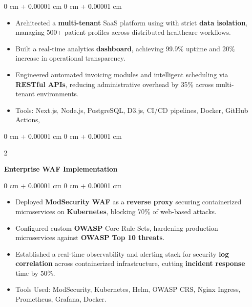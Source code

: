 \documentclass[10pt, letterpaper]{article}
\newenvironment{highlights}{
    \begin{itemize}[
        topsep=0.10 cm,
        parsep=0.10 cm,
        partopsep=0pt,
        itemsep=0pt,
        leftmargin=0 cm + 10pt
    ]
}{
    \end{itemize}
} %
\newenvironment{onecolentry}{
    \begin{adjustwidth}{
        0 cm + 0.00001 cm
    }{
        0 cm + 0.00001 cm
    }
}{
    \end{adjustwidth}
} %
\newenvironment{twocolentry}[2][]{
    \onecolentry
    \def\secondColumn{#2}
    \setcolumnwidth{\fill, 4.5 cm}
    \begin{paracol}{2}
}{
    \switchcolumn \raggedleft \secondColumn
    \end{paracol}
    \endonecolentry
} %
\begin{document}
        \vspace{0.10 cm}
        \begin{onecolentry}
            \begin{highlights}
                \item Architected a \textbf{multi-tenant} SaaS platform using  with strict \textbf{data isolation}, managing 500+ patient profiles across distributed healthcare workflows.
                \item Built a real-time analytics \textbf{dashboard}, achieving 99.9\% uptime and 20\% increase in operational transparency.
                \item Engineered automated invoicing  modules and intelligent scheduling via \textbf{RESTful APIs}, reducing administrative overhead by 35\% across multi-tenant environments.


                \item Tools: Next.js, Node.js, PostgreSQL, D3.js, CI/CD pipelines, Docker, GitHub Actions, 
            \end{highlights}
        \end{onecolentry}


        \vspace{0.2 cm}


        \begin{twocolentry}{
            
        }
            \textbf{Enterprise WAF Implementation}\end{twocolentry}

        \vspace{0.10 cm}
        \begin{onecolentry}
            \begin{highlights}
                \item Deployed \textbf{ModSecurity WAF} as a \textbf{reverse proxy} securing containerized microservices on \textbf{Kubernetes}, blocking 70\% of web-based attacks.
                \item Configured custom \textbf{OWASP} Core Rule Sets, hardening production microservices against \textbf{OWASP Top 10 threats}.
                \item Established a real-time observability and alerting stack for security \textbf{log correlation} across containerized infrastructure, cutting \textbf{incident response} time by 50\%.



                \item Tools Used:  ModSecurity, Kubernetes, Helm, OWASP CRS, Nginx Ingress, Prometheus, Grafana, Docker.
            \end{highlights}
        \end{onecolentry}
\end{document}
